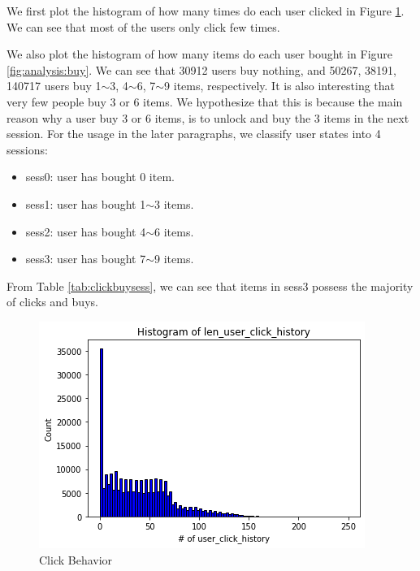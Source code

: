  We first plot the histogram of how many times do each user clicked in Figure \ref{fig:analysis:click}. 
We can see that most of the users only click few times.

 We also plot the histogram of how many items do each user bought in Figure \ref{fig:analysis:buy}. 
We can see that 30912 users buy nothing, and 50267, 38191, 140717 users buy 1$\sim$3, 4$\sim$6, 7$\sim$9 items, respectively.
It is also interesting that very few people buy 3 or 6 items. We hypothesize that this is because the main reason why a user buy 3 or 6 items, is to unlock and buy the 3 items in the next session.
For the usage in the later paragraphs, we classify user states into 4 sessions:
\begin{itemize}
    \item sess0: user has bought 0 item.
    \item sess1: user has bought 1$\sim$3 items.
    \item sess2: user has bought 4$\sim$6 items.
    \item sess3: user has bought 7$\sim$9 items.
\end{itemize}
From Table \ref{tab:clickbuysess}, we can see that items in sess3 possess the majority of clicks and buys.


\begin{figure}
    \centering
    \includegraphics[width=\linewidth]{figures/analysis/click.png}
    \caption{Click Behavior}
    \label{fig:analysis:click}
\end{figure}

